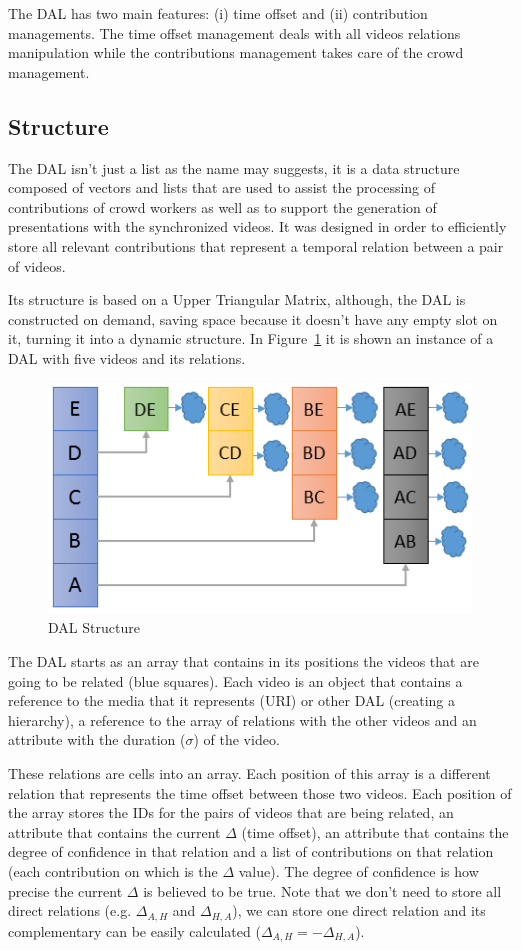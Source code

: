\documentclass[sigconf]{acmart}
\begin{document}
The DAL has two main features: (i) time offset and (ii) contribution managements. The time offset management deals with all videos relations manipulation while the contributions management takes care of the crowd management.

\subsection{Structure}
The DAL isn't just a list as the name may suggests, it is a data structure composed of vectors and lists that are used to assist the processing of contributions of crowd workers as well as to support the generation of presentations with the synchronized videos. It was designed in order to efficiently store all relevant contributions that represent a temporal relation between a pair of videos.

Its structure is based on a Upper Triangular Matrix, although, the DAL is constructed on demand, saving space because it doesn't have any empty slot on it, turning it into a dynamic structure. In Figure~\ref{structure-dal} it is shown an instance of a DAL with five videos and its relations.

\begin{figure}[h]
	\centerline{\includegraphics[scale=0.7] {figures/DAL/dal}}
	\caption{DAL Structure}
	\label{structure-dal}
\end{figure}

The DAL starts as an array that contains in its positions the videos that are going to be related (blue squares). Each video is an object that contains a reference to the media that it represents (URI) or other DAL (creating a hierarchy), a reference to the array of relations with the other videos and an attribute with the duration ($\sigma$) of the video.

These relations are cells into an array. Each position of this array is a different relation that represents the time offset between those two videos. Each position of the array stores the IDs for the pairs of videos that are being related, an attribute that contains the current $\Delta$ (time offset), an attribute that contains the degree of confidence in that relation and a list of contributions on that relation (each contribution on which is the $\Delta$ value). The degree of confidence is how precise the current $\Delta$ is believed to be true. Note that we don't need to store all direct relations (e.g. $\Delta_{A,H}$ and $\Delta_{H,A}$), we can store one direct relation and its complementary can be easily calculated ($\Delta_{A,H} = -\Delta_{H,A}$).
\end{document}
